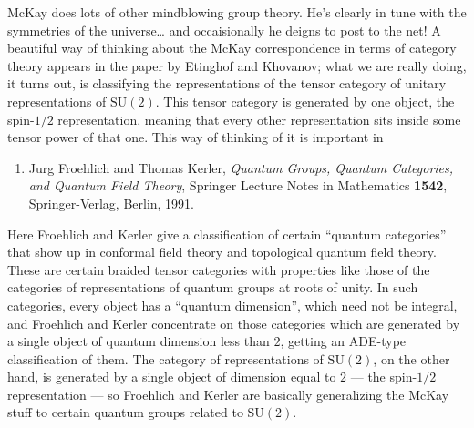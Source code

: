\documentclass{article}
\def\tightlist{}
\renewcommand{\texttt}[1]{%
  \begingroup
  \ttfamily
  \begingroup\lccode`~=`/\lowercase{\endgroup\def~}{/\discretionary{}{}{}}%
  \begingroup\lccode`~=`[\lowercase{\endgroup\def~}{[\discretionary{}{}{}}%
  \begingroup\lccode`~=`.\lowercase{\endgroup\def~}{.\discretionary{}{}{}}%
  \catcode`/=\active\catcode`[=\active\catcode`.=\active
  \scantokens{#1\noexpand}%
  \endgroup
}
\begin{document}

McKay does lots of other mindblowing group theory. He's clearly in tune
with the symmetries of the universe\ldots{} and occaisionally he deigns
to post to the net! A beautiful way of thinking about the McKay
correspondence in terms of category theory appears in the paper by
Etinghof and Khovanov; what we are really doing, it turns out, is
classifying the representations of the tensor category of unitary
representations of \(\mathrm{SU}(2)\). This tensor category is generated
by one object, the spin-\(1/2\) representation, meaning that every other
representation sits inside some tensor power of that one. This way of
thinking of it is important in

\begin{enumerate}
\def\labelenumi{\arabic{enumi})}
\setcounter{enumi}{4}
\tightlist
\item
  Jurg Froehlich and Thomas Kerler, \emph{Quantum Groups, Quantum
  Categories, and Quantum Field Theory}, Springer Lecture Notes in
  Mathematics \textbf{1542}, Springer-Verlag, Berlin, 1991.
\end{enumerate}

Here Froehlich and Kerler give a classification of certain ``quantum
categories'' that show up in conformal field theory and topological
quantum field theory. These are certain braided tensor categories with
properties like those of the categories of representations of quantum
groups at roots of unity. In such categories, every object has a
``quantum dimension'', which need not be integral, and Froehlich and
Kerler concentrate on those categories which are generated by a single
object of quantum dimension less than \(2\), getting an ADE-type
classification of them. The category of representations of
\(\mathrm{SU}(2)\), on the other hand, is generated by a single object
of dimension equal to \(2\) --- the spin-\(1/2\) representation --- so
Froehlich and Kerler are basically generalizing the McKay stuff to
certain quantum groups related to \(\mathrm{SU}(2)\).
\end{document}
